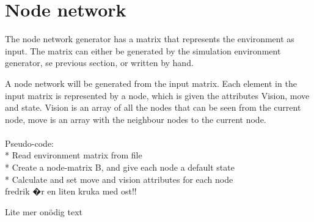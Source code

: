 \section{Node network}
The node network generator has a matrix that represents the environment as input. The matrix can either be generated by the simulation environment generator, se previous section, or written by hand.\\
\par{} A node network will be generated from the input matrix. Each element in the input matrix is represented by a node, which is given the attributes Vision, move and state. Vision is an array of all the nodes that can be seen from the current node, move is an array with the neighbour nodes to the current node.\\
\\
Pseudo-code:\\
* Read environment matrix from file\\
* Create a node-matrix B, and give each node a default state\\
* Calculate and set move and vision attributes for each node\\


fredrik �r en liten kruka med ost!!

Lite mer onödig text